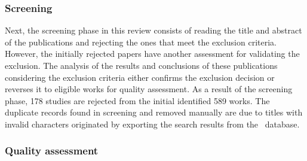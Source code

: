 \documentclass[10pt,a4paper,notitlepage,twocolumn,oneside]{article}
\begin{document}
\subsubsection{Screening}

Next, the screening phase in this review consists of reading the title and abstract of the publications and rejecting the ones that meet the exclusion criteria. However, the initially rejected papers have another assessment for validating the exclusion. The analysis of the results and conclusions of these publications considering the exclusion criteria either confirms the exclusion decision or reverses it to eligible works for quality assessment. As a result of the screening phase, 178 studies are rejected from the initial identified 589 works. The duplicate records found in screening and removed manually are due to titles with invalid characters originated by exporting the search results from the ~database.

\subsubsection{Quality assessment}
\end{document}

